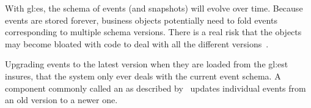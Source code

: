 
With \gls{gl:es}, the schema of events (and snapshots) will evolve over time. Because events are stored forever, business objects potentially need to fold events corresponding to multiple schema versions. There is a real risk that the objects may become bloated with code to deal with all the different versions~\citep{richardson2018microservices}. 

Upgrading events to the latest version when they are loaded from the \gls{gl:est} insures, that the system only ever deals with the current event schema. A component commonly called an  as described by~\citep{richardson2018microservices} updates individual events from an old version to a newer one.




